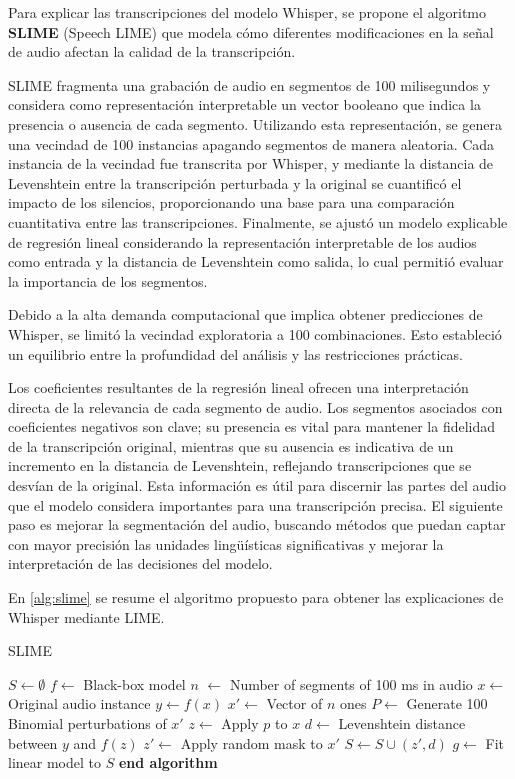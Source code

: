 \documentclass[conference]{IEEEtran}
\begin{document}
Para explicar las transcripciones del modelo Whisper, se propone el algoritmo \textbf{SLIME} (Speech LIME) que modela cómo diferentes modificaciones en la señal de audio afectan la calidad de la transcripción.

SLIME fragmenta una grabación de audio en segmentos de 100 milisegundos y considera como representación interpretable un vector booleano que indica la presencia o ausencia de cada segmento. Utilizando esta representación, se genera una vecindad de 100 instancias apagando segmentos de manera aleatoria. Cada instancia de la vecindad fue transcrita por Whisper, y mediante la distancia de Levenshtein entre la transcripción perturbada y la original se cuantificó el impacto de los silencios, proporcionando una base para una comparación cuantitativa entre las transcripciones. Finalmente, se ajustó un modelo explicable de regresión lineal considerando la representación interpretable de los audios como entrada y la distancia de Levenshtein como salida, lo cual permitió evaluar la importancia de los segmentos.

Debido a la alta demanda computacional que implica obtener predicciones de Whisper, se limitó la vecindad exploratoria a 100 combinaciones. Esto estableció un equilibrio entre la profundidad del análisis y las restricciones prácticas.

Los coeficientes resultantes de la regresión lineal ofrecen una interpretación directa de la relevancia de cada segmento de audio. Los segmentos asociados con coeficientes negativos son clave; su presencia es vital para mantener la fidelidad de la transcripción original, mientras que su ausencia es indicativa de un incremento en la distancia de Levenshtein, reflejando transcripciones que se desvían de la original. Esta información es útil para discernir las partes del audio que el modelo considera importantes para una transcripción precisa. El siguiente paso es mejorar la segmentación del audio, buscando métodos que puedan captar con mayor precisión las unidades lingüísticas significativas y mejorar la interpretación de las decisiones del modelo.

En \ref{alg:slime} se resume el algoritmo propuesto para obtener las explicaciones de Whisper mediante LIME.

\begin{algorithm}[H]
\caption{SLIME}
\begin{algorithmic}[1]
\State $S \gets \emptyset$
\State $f \gets$ Black-box model
\State $n$ $\gets$ Number of segments of 100 ms in audio
\State $x \gets$ Original audio instance
\State $y \gets f(x)$
\State $x' \gets$ Vector of $n$ ones
\State $P \gets$ Generate 100 Binomial perturbations of $x'$
    \State $z \gets$ Apply $p$ to $x$
    \State $d \gets$  Levenshtein distance between $y$ and $f(z)$
    \State $z' \gets$ Apply random mask to $x'$
    \State $S \gets S \cup (z', d)$
\EndFor
\State $g \gets$ Fit linear model to $S$
\State \textbf{end algorithm}
\end{algorithmic}
\label{alg:slime}
\end{algorithm}
\end{document}

